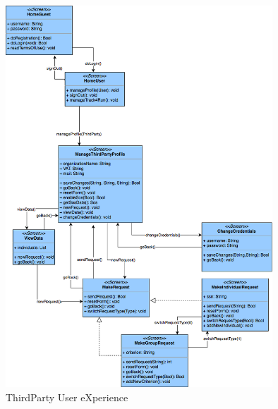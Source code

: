 \documentclass[a4paper]{article}
\begin{document}
    \begin{figure}[!htpb]
        \centering
    	\includegraphics[width=100mm]{images/ux/UX_ThirdParty.png}
    	\caption{ThirdParty User eXperience}
    \end{figure}
    \hfill

\newpage
\end{document}
